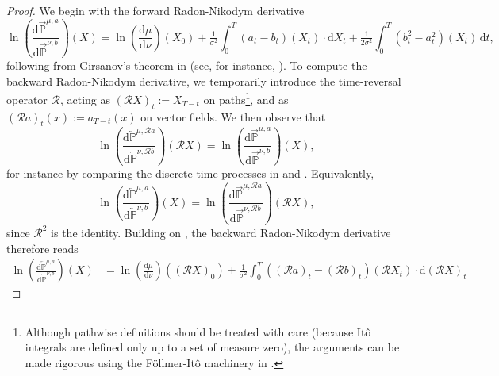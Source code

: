 \begin{proof}
We begin with the forward Radon-Nikodym derivative 
\[
\label{eq:RN_forward}
\ln\left(\frac{\mathrm{d}\overrightarrow{\mathbb{P}}^{\mu,a}}{\mathrm{d}\overrightarrow{\mathbb{P}}^{\nu,b}}\right)(X) = \ln\left(\frac{\mathrm{d}\mu}{\mathrm{d}\nu}\right)(X_0) + \tfrac{1}{\sigma^2}  \int_0^T (a_t-b_t)(X_t) \cdot {\mathrm{d}}X_t + \tfrac{1}{2 \sigma^2} \int_0^T \left( b_t^2 -a_t^2\right)(X_t) \, \mathrm{d}t,
\]
following from Girsanov's theorem in  (see, for instance, \textcite[Lemma A.1]{nusken2021solving}). To compute the backward Radon-Nikodym derivative, we temporarily introduce the time-reversal operator $\mathcal{R}$, acting as $(\mathcal{R}X)_t := X_{T-t}$ on paths\footnote{Although pathwise definitions should be treated with care (because It\^o integrals are defined only up to a set of measure zero), the arguments can be made rigorous using the F{\"o}llmer-It{\^o} machinery in .}, and as $(\mathcal{R}a)_t(x) := a_{T-t}(x)$ on vector fields. We then observe that 
\begin{equation} 
\nonumber
\ln\left(\frac{\mathrm{d}\overleftarrow{\mathbb{P}}^{\mu,\mathcal{R}a}}{\mathrm{d}\overleftarrow{\mathbb{P}}^{\nu,\mathcal{R}b}}\right)(\mathcal{R}X) = \ln\left(\frac{\mathrm{d}\overrightarrow{\mathbb{P}}^{\mu,a}}{\mathrm{d}\overrightarrow{\mathbb{P}}^{\nu,b}}\right)(X), 
\end{equation}
for instance by comparing the discrete-time processes in  and . Equivalently,
\begin{equation} 
\nonumber
\ln\left(\frac{\mathrm{d}\overleftarrow{\mathbb{P}}^{\mu,a}}{\mathrm{d}\overleftarrow{\mathbb{P}}^{\nu,b}}\right)(X) = \ln\left(\frac{\mathrm{d}\overrightarrow{\mathbb{P}}^{\mu,\mathcal{R}a}}{\mathrm{d}\overrightarrow{\mathbb{P}}^{\nu,\mathcal{R}b}}\right)(\mathcal{R}X), \end{equation}
since $\mathcal{R}^2$ is the identity.
Building on , the backward Radon-Nikodym derivative therefore reads
\begin{subequations}
\label{eq:RN_backward}
\begin{align}
\nonumber
\ln\left(\frac{\mathrm{d}\overleftarrow{\mathbb{P}}^{\mu,a}}{\mathrm{d}\overleftarrow{\mathbb{P}}^{\nu,b}}\right)(X) &  = \ln\left(\frac{\mathrm{d}\mu}{\mathrm{d}\nu}\right)((\mathcal{R}X)_0) + \tfrac{1}{\sigma^2}  \int_0^T ((\mathcal{R} a)_t- (\mathcal{R} b)_t)(\mathcal{R} X_t) \cdot {\mathrm{d}} (\mathcal{R} X)_t 

\end{align}
\end{subequations}
\end{proof}

